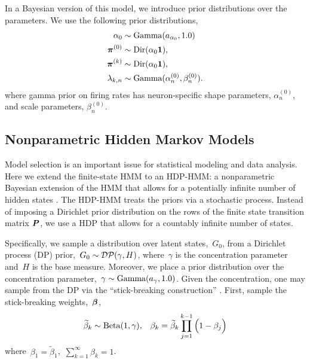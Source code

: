 
In a Bayesian version of this model,  we introduce prior distributions over
the parameters. We use the following prior distributions,
\begin{align*}
  \alpha_0 &\sim \mathrm{Gamma}(a_{\alpha_0}, 1.0) \\
  \boldsymbol{\pi}^{(0)} &\sim \mathrm{Dir}(\alpha_0\boldsymbol{1}),\\
  \boldsymbol{\pi}^{(k)} &\sim \mathrm{Dir}(\alpha_0\boldsymbol{1}), \\
  \lambda_{k,n} &\sim \mathrm{Gamma}(\alpha_n^{(0)},\beta_n^{(0)}).
\end{align*}
where gamma prior on firing rates has neuron-specific shape parameters,
$\alpha_n^{(0)}$, and scale parameters, $\beta_n^{(0)}$.

\subsection{Nonparametric Hidden Markov Models}

Model selection is an important issue for statistical modeling and
data analysis.  Here we extend the finite-state HMM to an
HDP-HMM: a nonparametric Bayesian extension of the HMM that allows for
a potentially infinite number of hidden states \citep{Teh06,
  Beal02}. The HDP-HMM treats the priors via a stochastic
process. Instead of imposing a Dirichlet prior distribution on the
rows of the finite state transition matrix $\boldsymbol{P}$, we use a HDP that
allows for a countably infinite number of states.

Specifically, we sample a distribution over latent states,~$G_0$, from
a Dirichlet process (DP) \citep{Ferguson73}
prior,~${G_0\sim \mathcal{DP}(\gamma,H)}$, where~$\gamma$ is the
concentration parameter and~$H$ is the base measure.  Moreover, we
place a prior distribution over the concentration parameter,~$\gamma
\sim \mathrm{Gamma}(a_{\gamma}, 1.0)$.  Given the concentration, one may
sample from the DP via the ``stick-breaking construction''
\citep{Sethuraman94}. First, sample the stick-breaking
weights,~$\boldsymbol{\beta}$,
\begin{eqnarray}                                   
\widetilde{\beta}_{k}\sim \mathrm{Beta}(1,\gamma), \;\;\; \beta_{k}=\widetilde{\beta}_{k}\prod_{j=1}^{k-1}\Big(1-\beta_{j}\Big)
\label{stick1}
\end{eqnarray}
where~$\beta_1 = \widetilde{\beta}_1$,~$\sum_{k=1}^\infty \beta_{k}=1$.

